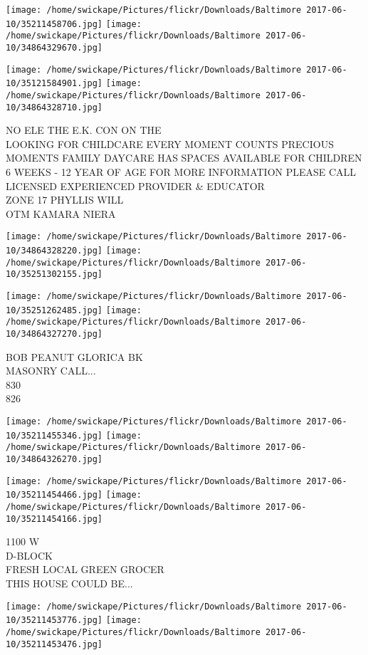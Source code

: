 \documentclass[10pt,letterpaper]{article}
\begin{document}
\texttt{[image: /home/swickape/Pictures/flickr/Downloads/Baltimore 2017-06-10/35211458706.jpg]}
\texttt{[image: /home/swickape/Pictures/flickr/Downloads/Baltimore 2017-06-10/34864329670.jpg]}

\texttt{[image: /home/swickape/Pictures/flickr/Downloads/Baltimore 2017-06-10/35121584901.jpg]}
\texttt{[image: /home/swickape/Pictures/flickr/Downloads/Baltimore 2017-06-10/34864328710.jpg]}

NO ELE THE E.K. CON ON THE\\
LOOKING FOR CHILDCARE EVERY MOMENT COUNTS PRECIOUS MOMENTS FAMILY DAYCARE HAS SPACES AVAILABLE FOR CHILDREN 6 WEEKS {-} 12 YEAR OF AGE FOR MORE INFORMATION PLEASE CALL LICENSED EXPERIENCED PROVIDER \& EDUCATOR\\
ZONE 17 PHYLLIS WILL\\
OTM KAMARA NIERA
\pagebreak

\texttt{[image: /home/swickape/Pictures/flickr/Downloads/Baltimore 2017-06-10/34864328220.jpg]}
\texttt{[image: /home/swickape/Pictures/flickr/Downloads/Baltimore 2017-06-10/35251302155.jpg]}

\texttt{[image: /home/swickape/Pictures/flickr/Downloads/Baltimore 2017-06-10/35251262485.jpg]}
\texttt{[image: /home/swickape/Pictures/flickr/Downloads/Baltimore 2017-06-10/34864327270.jpg]}

BOB PEANUT GLORICA BK\\
MASONRY CALL...\\
830\\
826
\pagebreak

\texttt{[image: /home/swickape/Pictures/flickr/Downloads/Baltimore 2017-06-10/35211455346.jpg]}
\texttt{[image: /home/swickape/Pictures/flickr/Downloads/Baltimore 2017-06-10/34864326270.jpg]}

\texttt{[image: /home/swickape/Pictures/flickr/Downloads/Baltimore 2017-06-10/35211454466.jpg]}
\texttt{[image: /home/swickape/Pictures/flickr/Downloads/Baltimore 2017-06-10/35211454166.jpg]}

1100 W\\
D{-}BLOCK\\
FRESH LOCAL GREEN GROCER\\
THIS HOUSE COULD BE...
\pagebreak

\texttt{[image: /home/swickape/Pictures/flickr/Downloads/Baltimore 2017-06-10/35211453776.jpg]}
\texttt{[image: /home/swickape/Pictures/flickr/Downloads/Baltimore 2017-06-10/35211453476.jpg]}
\end{document}
